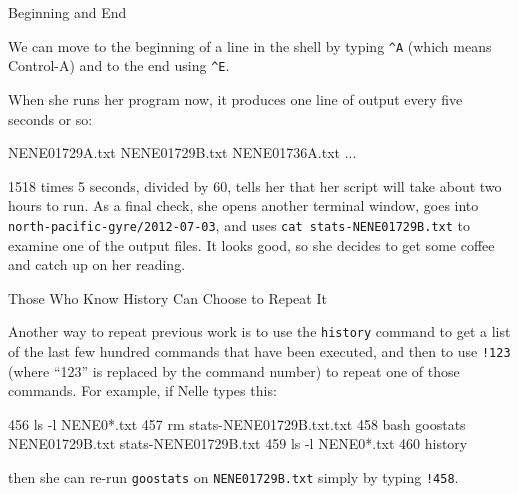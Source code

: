 \begin{swcbox}{Beginning and End}

We can move to the beginning of a line in the shell by typing
\texttt{\^{}A} (which means Control-A) and to the end using
\texttt{\^{}E}.

\end{swcbox}

When she runs her program now, it produces one line of output every five
seconds or so:

\begin{VerbOut}
NENE01729A.txt
NENE01729B.txt
NENE01736A.txt
...
\end{VerbOut}

1518 times 5 seconds, divided by 60, tells her that her script will take
about two hours to run. As a final check, she opens another terminal
window, goes into \texttt{north-pacific-gyre/2012-07-03}, and uses
\texttt{cat stats-NENE01729B.txt} to examine one of the output files. It
looks good, so she decides to get some coffee and catch up on her
reading.

\begin{swcbox}{Those Who Know History Can Choose to Repeat It}

Another way to repeat previous work is to use the \texttt{history}
command to get a list of the last few hundred commands that have been
executed, and then to use \texttt{!123} (where ``123'' is replaced by
the command number) to repeat one of those commands. For example, if
Nelle types this:


\begin{VerbOut}
  456  ls -l NENE0*.txt
  457  rm stats-NENE01729B.txt.txt
  458  bash goostats NENE01729B.txt stats-NENE01729B.txt
  459  ls -l NENE0*.txt
  460  history
\end{VerbOut}

then she can re-run \texttt{goostats} on \texttt{NENE01729B.txt} simply
by typing \texttt{!458}.

\end{swcbox}

